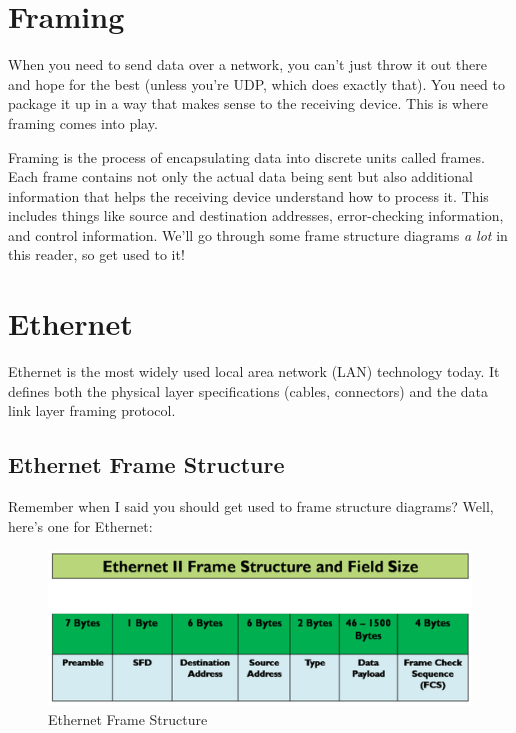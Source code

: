 \section{Framing}\label{sec:framing}
When you need to send data over a network, you can't just throw it out there and hope for the best (unless you're UDP, which does exactly that). You need to package it up in a way that makes sense to the receiving device. This is where framing comes into play.

Framing is the process of encapsulating data into discrete units called frames. Each frame contains not only the actual data being sent but also additional information that helps the receiving device understand how to process it. This includes things like source and destination addresses, error-checking information, and control information. We'll go through some frame structure diagrams \textit{a lot} in this reader, so get used to it!

\section{Ethernet}
\label{sec:ethernet}
Ethernet is the most widely used local area network (LAN) technology today. It defines both the physical layer specifications (cables, connectors) and the data link layer framing protocol.

\subsection{Ethernet Frame Structure}
Remember when I said you should get used to frame structure diagrams? Well, here's one for Ethernet:

\begin{figure}[h]
    \centering
    \includegraphics[width=\textwidth]{assets/osi/datalink/protocols/ethernet.png}
    \caption{Ethernet Frame Structure}
    \label{fig:ethernet_frame_structure}
\end{figure}

